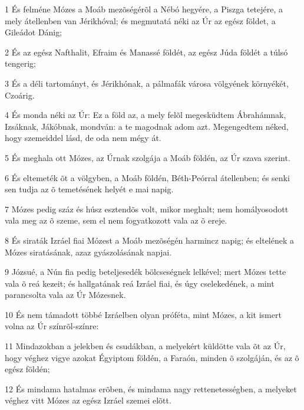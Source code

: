 \par 1 És felméne Mózes a Moáb mezõségérõl a Nébó hegyére, a Piszga tetejére, a mely átellenben van Jérikhóval; és megmutatá néki az Úr az egész földet, a Gileádot Dánig;
\par 2 És az egész Nafthalit, Efraim és Manassé földét, az egész Júda földét a túlsó tengerig;
\par 3 És a déli tartományt, és Jérikhónak, a pálmafák városa völgyének környékét, Czoárig.
\par 4 És monda néki az Úr: Ez a föld az, a mely felõl megesküdtem Ábrahámnak, Izsáknak, Jákóbnak, mondván: a te magodnak adom azt. Megengedtem néked, hogy szemeiddel lásd, de  oda nem mégy át.
\par 5 És meghala ott Mózes, az Úrnak szolgája a Moáb földén, az Úr szava szerint.
\par 6 És eltemeték õt a völgyben, a Moáb földén, Béth-Peórral átellenben; és senki sen tudja az õ temetésének helyét e mai napig.
\par 7 Mózes pedig száz és húsz esztendõs volt, mikor meghalt; nem homályosodott vala meg az õ szeme, sem el nem fogyatkozott vala az õ ereje.
\par 8 És siraták Izráel fiai Mózest a Moáb mezõségén harmincz napig; és eltelének a Mózes siratásának, azaz gyászolásának napjai.
\par 9 Józsué, a Nún fia pedig beteljesedék bölcseségnek lelkével; mert Mózes tette vala õ reá kezeit; és hallgatának reá Izráel fiai, és úgy cselekedének, a mint parancsolta vala az Úr Mózesnek.
\par 10 És nem támadott többé Izráelben olyan próféta, mint Mózes, a kit ismert volna az Úr színrõl-színre:
\par 11 Mindazokban a jelekben és csudákban, a melyekért küldötte vala õt az Úr, hogy véghez vigye azokat Égyiptom földén, a Faraón, minden õ szolgáján, és az õ egész földén;
\par 12 És mindama hatalmas erõben, és mindama nagy rettenetességben, a melyeket véghez vitt Mózes az egész Izráel szemei elõtt.


